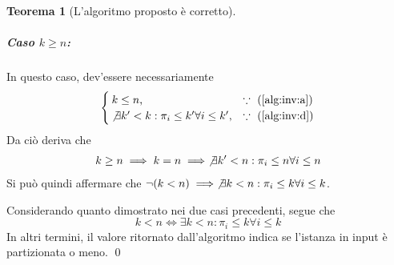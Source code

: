\documentclass{article}
\theoremstyle{definition}
\newtheorem{theorem}{Teorema}
\begin{document}
\begin{theorem}[L'algoritmo proposto è corretto]
    \subparagraph{Caso $k \geq n$:}
    In questo caso, dev'essere necessariamente
    \begin{equation*}
        \begin{cases}
            k \leq n \mbox{,}                                             & \because \mbox{ (\ref{alg:inv:a})} \\
            \not\exists k' < k : \pi_i \leq k' \forall i \leq k' \mbox{,} & \because \mbox{ (\ref{alg:inv:d})}
        \end{cases}
    \end{equation*}
    Da ciò deriva che
    \begin{align*}
        k \geq n \implies k = n  \implies \not\exists k' < n : \pi_i \leq n \forall i \leq n
    \end{align*}
    Si può quindi affermare che $\neg(k < n) \implies \not\exists k < n : \pi_i \leq k \forall i \leq k$.

    Considerando quanto dimostrato nei due casi precedenti, segue che
    \[ k < n \iff \exists k < n : \pi_i \leq k \forall i \leq k \]
    In altri termini, il valore ritornato dall'algoritmo indica se l'istanza in input è partizionata o meno.
    \qed

\end{theorem}
\end{document}
